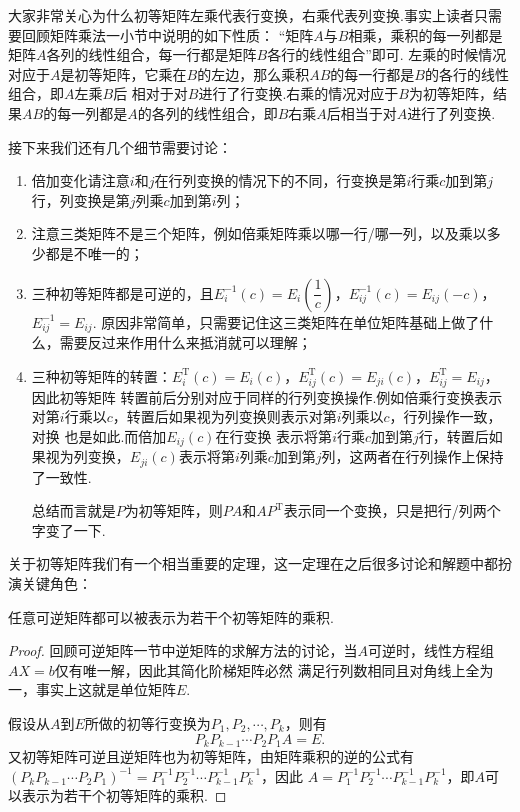大家非常关心为什么初等矩阵左乘代表行变换，右乘代表列变换.事实上读者只需要回顾矩阵乘法一小节中说明的如下性质：
``矩阵$A$与$B$相乘，乘积的每一列都是矩阵$A$各列的线性组合，每一行都是矩阵$B$各行的线性组合''即可.
左乘的时候情况对应于$A$是初等矩阵，它乘在$B$的左边，那么乘积$AB$的每一行都是$B$的各行的线性组合，即$A$左乘$B$后
相对于对$B$进行了行变换.右乘的情况对应于$B$为初等矩阵，结果$AB$的每一列都是$A$的各列的线性组合，即$B$右乘$A$后相当于对$A$进行了列变换.

接下来我们还有几个细节需要讨论：
\begin{enumerate}
    \item 倍加变化请注意$i$和$j$在行列变换的情况下的不同，行变换是第$i$行乘$c$加到第$j$行，列变换是第$j$列乘$c$加到第$i$列；

    \item 注意三类矩阵不是三个矩阵，例如倍乘矩阵乘以哪一行/哪一列，以及乘以多少都是不唯一的；

    \item 三种初等矩阵都是可逆的，且$E_i^{-1}(c)=E_i\left(\dfrac{1}{c}\right)$，$E_{ij}^{-1}(c)=E_{ij}(-c)$，$E_{ij}^{-1}=E_{ij}$.
    原因非常简单，只需要记住这三类矩阵在单位矩阵基础上做了什么，需要反过来作用什么来抵消就可以理解；

    \item 三种初等矩阵的转置：$E_i^\mathrm{T}(c)=E_i(c)$，$E_{ij}^\mathrm{T}(c)=E_{ji}(c)$，$E_{ij}^\mathrm{T}=E_{ij}$，因此初等矩阵
    转置前后分别对应于同样的行列变换操作.例如倍乘行变换表示对第$i$行乘以$c$，转置后如果视为列变换则表示对第$i$列乘以$c$，行列操作一致，对换
    也是如此.而倍加$E_{ij}(c)$在行变换
    表示将第$i$行乘$c$加到第$j$行，转置后如果视为列变换，$E_{ji}(c)$表示将第$i$列乘$c$加到第$j$列，这两者在行列操作上保持了一致性.

    总结而言就是$P$为初等矩阵，则$PA$和$AP^\mathrm{T}$表示同一个变换，只是把行/列两个字变了一下.
\end{enumerate}

关于初等矩阵我们有一个相当重要的定理，这一定理在之后很多讨论和解题中都扮演关键角色：
\begin{theorem}\label{thm:10:可逆与初等变换}
    任意可逆矩阵都可以被表示为若干个初等矩阵的乘积.
\end{theorem}
\begin{proof}
    回顾可逆矩阵一节中逆矩阵的求解方法的讨论，当$A$可逆时，线性方程组$AX=b$仅有唯一解，因此其简化阶梯矩阵必然
    满足行列数相同且对角线上全为一，事实上这就是单位矩阵$E$.

    假设从$A$到$E$所做的初等行变换为$P_1,P_2,\cdots,P_k$，则有
    \[P_kP_{k-1}\cdots P_2P_1A=E.\]
    又初等矩阵可逆且逆矩阵也为初等矩阵，由矩阵乘积的逆的公式有$(P_kP_{k-1}\cdots P_2P_1)^{-1}=P_1^{-1}P_2^{-1}\cdots P_{k-1}^{-1}P_k^{-1}$，因此
    $A=P_1^{-1}P_2^{-1}\cdots P_{k-1}^{-1}P_k^{-1}$，即$A$可以表示为若干个初等矩阵的乘积.
\end{proof}

